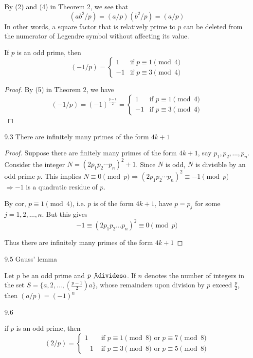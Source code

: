 \begin{remark}
    By (2) and (4) in Theorem 2, we see that
    \[
        (ab^2/p) = (a/p)(b^2/p) = (a/p)
    \]
    In other words, a square factor that is relatively prime to $p$ can be deleted
    from the numerator of Legendre symbol without affecting its value.
\end{remark}


\begin{corollary}
    If $p$ is an odd prime, then 
    \[
        (-1/p) = \begin{cases}
             1 &\text{if } p \equiv 1 \pmod 4\\
            -1 &\text{if } p \equiv 3 \pmod 4
        \end{cases}
    \]
\end{corollary}
\begin{proof}
    By (5) in Theorem 2, we have
    \[
        (-1/p) = {(-1)}^{\frac{p-1}{2}} = \begin{cases}
             1 &\text{if } p \equiv 1 \pmod 4 \\
            -1 &\text{if } p \equiv 3 \pmod 4
        \end{cases}
    \]
\end{proof}

\begin{theorem}
    9.3
    There are infinitely many primes of the form $4k + 1$
\end{theorem}
\begin{proof}
    Suppose there are finitely many primes of the form $4k + 1$, say $p_1, p_2, \dots, p_n$.
    Consider the integer $N = {(2p_1p_2 \cdots p_n)}^2 + 1$.
    Since $N$ is odd, $N$ is divisible by an odd prime $p$.
    This implies $N \equiv 0 \pmod p \Rightarrow {(2p_1p_2 \cdots p_n)}^2 \equiv -1 \pmod p$
    $\Rightarrow -1$ is a quadratic residue of $p$.
    
    By cor, $p \equiv 1 \pmod 4$, i.e. $p$ is of the form $4k + 1$, have $p = p_j$ for some $j = 1, 2, \dots, n$.
    But this gives 
    \[
        -1 \equiv {(2p_1p_2 \dots p_n)}^2 \equiv 0 \pmod p
    \]

    Thus there are infinitely many primes of the form $4k + 1$
\end{proof}


\begin{theorem}
    9.5 Gauss' lemma

    Let $p$ be an odd prime and $p \not\divides a$.
    If $n$ denotes the number of integers in the set $S = \{a, 2, \dots, (\frac{p-1}{2})a\}$,
    whose remainders upon division by $p$ exceed $\frac{p}{2}$, then $(a / p) = {(-1)}^n$
\end{theorem}

\begin{theorem}
    9.6

    if $p$ is an odd prime, then 
    \[
        (2/p) = \begin{cases}
            1  & \text{ if } p \equiv 1 \pmod 8 \text{ or } p \equiv 7 \pmod 8 \\
            -1 & \text{ if } p \equiv 3 \pmod 8 \text{ or } p \equiv 5 \pmod 8
        \end{cases}
    \]
\end{theorem}